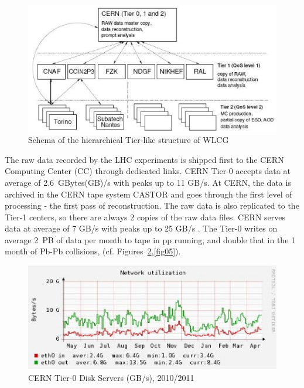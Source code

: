 \begin{figure}[htb] %
\centering
\includegraphics[width=13cm]{fig03.eps} %
\caption{Schema of the hierarchical Tier-like structure of
WLCG}\label{fig03}
\end{figure}




The raw data recorded by the LHC experiments  is shipped
first to the CERN Computing Center (CC) through dedicated links.
CERN Tier-0 accepts data at average of 2.6~GBytes(GB)/s with peaks
up to 11 GB/s. At CERN, the data is archived in the CERN tape system
CASTOR \cite{castor} and goes through the first level of processing - the
first pass of reconstruction. The raw data is also replicated to the
Tier-1 centers, so there are always 2 copies of the raw data files.
CERN serves data at average of 7 GB/s with peaks up to 25 GB/s \cite{TERENA}.
The Tier-0 writes on average 2~PB of data per month to tape in pp
running, and double that in the 1 month of Pb-Pb collisions, (cf.
Figures~\ref{fig04},\ref{fig05}).


\begin{figure}[htb] %
\centering
\includegraphics[width=13cm]{fig04.eps} %
\caption{CERN Tier-0 Disk Servers (GB/s), 2010/2011}\label{fig04}
\end{figure}



